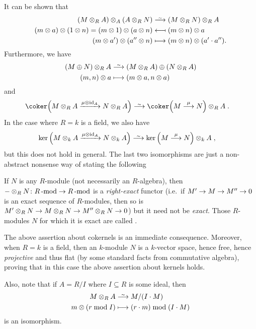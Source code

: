 \documentclass[a4paper,parskip=half,numbers=enddot, DIV=12, headheight=30pt]{scrreprt}
\begin{document}
It can be shown that
\begin{align*}
    (M\otimes_R A)\otimes_A(A\otimes_R N)&\isomorphism (M\otimes_R N) \otimes_R A\\
    (m\otimes a)\otimes(1\otimes n) = (m\otimes 1)\otimes(a\otimes n) &\longmapsfrom (m\otimes n)\otimes a\\
    (m\otimes a')\otimes(a''\otimes n) &\longmapsto (m\otimes n)\otimes(a'\cdot a'').
\end{align*}
Furthermore, we have
\begin{align*}
    (M\oplus N) \otimes_R A &\isomorphism (M\otimes_R A)\oplus(N\otimes_R A)\\
    (m,n)\otimes a &\longmapsto (m\otimes a, n\otimes a)
\end{align*}
and 
\begin{align*}
    \coker\Big(M\otimes_R A\xrightarrow{\mu\otimes \id_A} N\otimes_R A\Big) &\isomorphism \coker\Big(M\morphism[\mu] N\Big)\otimes_R A\;.
\end{align*}
In the case where $R=k$ is a field, we also have 
\begin{align*}
    \ker\Big(M\otimes_kA \xrightarrow{\mu\otimes \id_A} N\otimes_k A\Big) &\isomorphism \ker\left(M\morphism[\mu] N \right)\otimes_k A\;,
\end{align*}
but this does not hold in general. The last two isomorphisms are just a non-abstract nonsense way of stating the following
\begin{fact}
	If $N$ is any $R$-module (not necessarily an $R$-algebra), then $-\otimes_RN\colon R\cat{-mod}\morphism R\cat{-mod}$ is a \emph{right-exact} functor (i.e.\ if $M'\morphism M\morphism M''\morphism0$ is an exact sequence of $R$-modules, then so is $M'\otimes_RN\morphism M\otimes_RN\morphism M''\otimes_RN\morphism 0$) but it need not be \emph{exact}. Those $R$-modules $N$ for which it is exact are called .
\end{fact}
The above assertion about cokernels is an immediate consequence. Moreover, when $R=k$ is a field, then an $k$-module $N$ is a $k$-vector space, hence free, hence \emph{projective} and thus flat (by some standard facts from commutative algebra), proving that in this case the above assertion about kernels holds.

\begin{fact}
	Also, note that if $A=R/I$ where $I\subseteq R$ is some ideal, then 
	\begin{align*}
		M\otimes_R A &\isomorphism M/(I\cdot M)\\
		m\otimes(r\bmod I) &\longmapsto (r\cdot m) \bmod (I\cdot M)
	\end{align*}
	is an isomorphism.
\end{fact}
\end{document}
